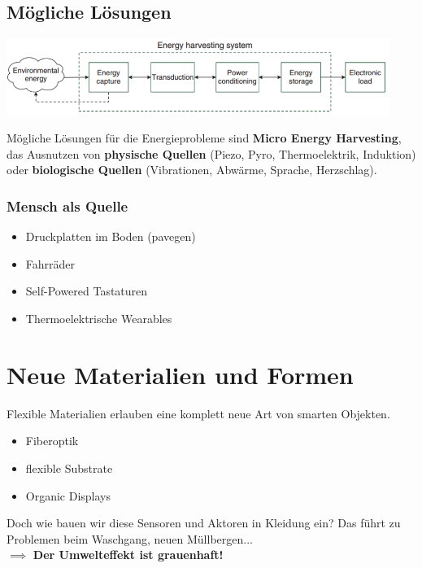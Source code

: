\documentclass[a4paper]{article}
\begin{document}
\subsection{Mögliche Lösungen}
\begin{center}
	\includegraphics[height = 2.5cm]{Harvesting.png}
\end{center}

Mögliche Lösungen für die Energieprobleme sind \textbf{Micro Energy Harvesting}, das Ausnutzen von \textbf{physische Quellen} (Piezo, Pyro, Thermoelektrik, Induktion) oder \textbf{biologische Quellen} (Vibrationen, Abwärme, Sprache, Herzschlag).
\subsubsection{Mensch als Quelle}
\begin{itemize}
	\item Druckplatten im Boden (pavegen)
	\item Fahrräder
	\item Self-Powered Tastaturen
	\item Thermoelektrische Wearables
\end{itemize}

\newpage
\section{Neue Materialien und Formen}
Flexible Materialien erlauben eine komplett neue Art von smarten Objekten.
\begin{itemize}
	\item Fiberoptik
	\item flexible Substrate
	\item Organic Displays
\end{itemize}
Doch wie bauen wir diese Sensoren und Aktoren in Kleidung ein? Das führt zu Problemen beim Waschgang, neuen Müllbergen... \\
$\implies$ \textbf{Der Umwelteffekt ist grauenhaft!}
\end{document}
